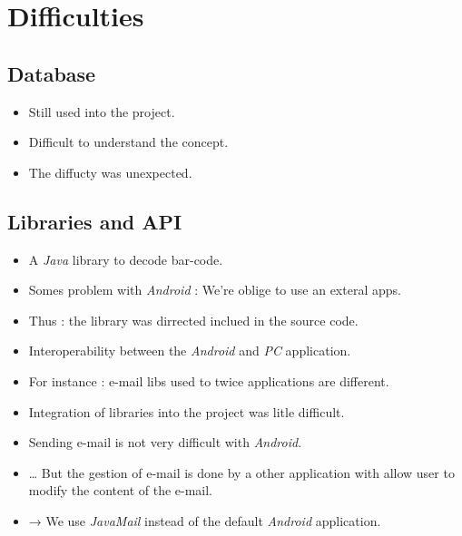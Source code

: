 \documentclass{beamer}
\begin{document}
\section{Difficulties}
\subsection{Database}

\begin{frame}[Hibernate]
\begin{itemize}
\item Still used into the project.
\pause \item Difficult to understand the concept.
\pause \item The diffucty was unexpected.
\end{itemize}
\end{frame}

\subsection{Libraries and API}

\begin{frame}[Zxing]
\begin{itemize}
\item A \emph{Java} library to decode bar-code.
\pause \item Somes problem with \emph{Android} \pause : We're oblige to use an exteral apps.
\pause \item Thus : the library was dirrected inclued in the source code.
\end{itemize}
\end{frame}

\begin{frame}
\begin{itemize}
\item Interoperability between the \emph{Android} and \emph{PC} application.
\pause \item For instance : e-mail libs used to twice applications are different.
\pause \item Integration of libraries into the project was litle difficult.
\end{itemize}
\end{frame}

\begin{frame}[JavaMail]
\begin{itemize}
\item Sending e-mail is not very difficult with \emph{Android}.
\item … But the gestion of e-mail is done by a other application \pause with allow user to modify the content of the e-mail.
\item → We use \emph{JavaMail} instead of the default \emph{Android} application.
\end{itemize}
\end{frame}



\end{document}
